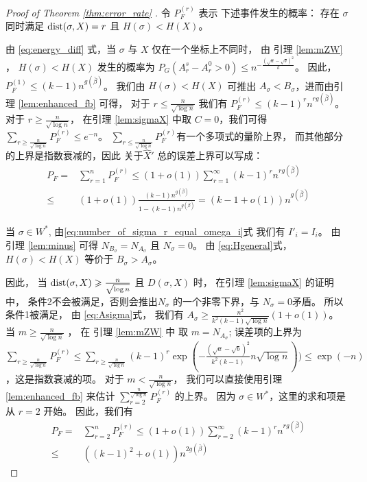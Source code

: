 \begin{proof}[Proof of Theorem \ref{thm:error_rate} ]

	令 $P_F^{(r)}$ 表示
  下述事件发生的概率：
  存在 $\sigma$ 同时满足
  $\operatorname{dist}(\sigma, X) = r$ 且
  $H(\sigma) < H(X)$。
	
	由 \eqref{eq:energy_diff} 式，当
  $\sigma$ 与 $X$ 仅在一个坐标上不同时，
  由 引理 \ref{lem:mZW} ，
  $H(\sigma) < H(X)$ 发生的概率为
	$P_G(A_r^s - A_r^0 > 0) \leq n^{-\frac{(\sqrt{a}-\sqrt{b})^2}{k}}$。
  因此，$P_F^{(1)}  \leq (k-1)n^{g(\bar{\beta})}$。
	我们由 $H(\sigma) < H(X)$ 可推出 $A_{\sigma} < B_{\sigma}$，进而由引理 \ref{lem:enhanced_fb} 
  可得，
  对于 $ r \leq \frac{n}{\sqrt{\log n}}$
  我们有
  $P_F^{(r)} \leq (k-1)^r n^{rg(\bar{\beta})}$。
	对于
  $ r \geq \frac{n}{\sqrt{\log n}}$， 在引理
 \ref{lem:sigmaX} 中取 $C=0$，我们可得
  $\sum_{r\geq \frac{n}{\sqrt{\log n}}}P_F^{(r)} \leq e^{-n}$。
	$\sum_{r\leq \frac{n}{\sqrt{\log n}}}P_F^{(r)}$有一个多项式的量阶上界，
  而其他部分的上界是指数衰减的，因此
  关于$\hat{X}'$ 总的误差上界可以写成：
  \begin{align*}
	P_F = & \sum_{r=1}^n P_F^{(r)} \leq (1+o(1)) \sum_{r=1}^{\infty} (k-1)^r n^{rg(\bar{\beta})}\\
	\leq & (1+o(1))\frac{(k-1) n^{g(\bar{\beta})}}{1-(k-1) n^{g(\bar{\beta})}} = (k-1+o(1))n^{g(\bar{\beta})}
	\end{align*}   
	
当 $\sigma \in W^*$, 由\eqref{eq:number_of_sigma_r_equal_omega_i}式
 我们有 $I'_i = I_i$。
由 引理 \ref{lem:minus} 可得
$N_{B_{\sigma}} = 
N_{A_{\sigma}}$
且 $N_{\sigma} = 0$。
由 \eqref{eq:Hgeneral}式，
$H(\sigma) < H(X)$ 等价于
$B_{\sigma} > A_{\sigma}$。

因此，
当 $ \operatorname{dist}(\sigma, X) \geqslant \frac{n}{\sqrt{\log n} }$ 且 $D(\sigma, X)$
时，
在引理 \ref{lem:sigmaX} 的证明中，
条件2不会被满足，否则会推出$N_{\sigma}$
的一个非零下界，与  $N_{\sigma} = 0$矛盾。
所以条件1被满足，
由 \eqref{eq:Asigma}式，
我们有 $A_{\sigma} \geq \frac{n^2}{k^2(k-1)\sqrt{\log n} } (1+o(1))$。
当 $m \geq \frac{n}{ \sqrt{\log n}}$ ，
在 引理 \ref{lem:mZW}  中 取
$m=N_{A_{\sigma}}$;
误差项的上界为 $\sum_{r\geq \frac{n}{ \sqrt{\log n}}} P_F^{(r)} \leq \sum_{r\geq \frac{n}{ \sqrt{\log n}}} (k-1)^r \exp(-\frac{(\sqrt{a} - \sqrt{b})^2}{k^2(k-1)} n \sqrt{\log n}))
\leq \exp(-n)$，这是指数衰减的项。
对于 $m < \frac{n}{ \sqrt{\log n}}$，
我们可以直接使用引理 \ref{lem:enhanced_fb}   
来估计 $\sum_{r=2}^{\frac{n}{ \sqrt{\log n}}} P_F^{(r)}$
的上界。
因为 $\sigma \in W^*$，这里的求和项是从 $r=2$ 开始。
因此，我们有
\begin{align*}
P_F = & \sum_{r=2}^n P_F^{(r)} \leq (1+o(1)) \sum_{r=2}^{\infty} (k-1)^r n^{rg(\bar{\beta})}\\
\leq & ((k-1)^2+o(1))n^{2g(\bar{\beta})}
\end{align*}
\end{proof}